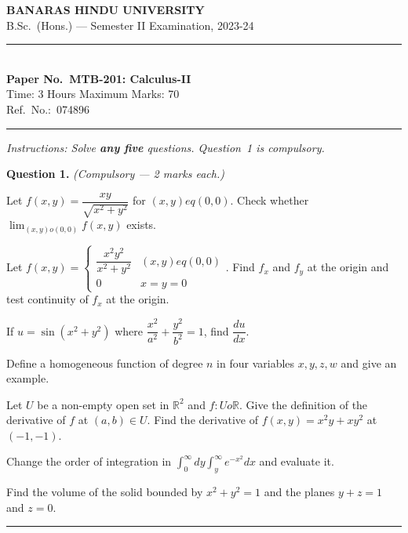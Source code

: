 \documentclass[11pt,a4paper]{article}
\begin{document}
\begin{center}
  {\large\bfseries BANARAS HINDU UNIVERSITY}\\[2pt]
  {\normalsize B.Sc.\ (Hons.) --- Semester II Examination, 2023-24}\\[6pt]
  \rule{0.8\linewidth}{0.5pt}\\[6pt]
  {\large\bfseries Paper No.\ MTB-201: Calculus-II}\\[4pt]
  {\normalsize Time: 3 Hours \hfill Maximum Marks: 70}\\[2pt]
  {\small Ref.\ No.:\ 074896}
\end{center}
\rule{\linewidth}{0.4pt}
\smallskip



\noindent   \textit{Instructions: Solve   \textbf{any five} questions. Question~1 is compulsory.}
\bigskip




\noindent   \textbf{Question 1.}   \textit{(Compulsory --- 2 marks each.)}

\begin{parts}
  \item Let $f(x,y)=\dfrac{xy}{\sqrt{x^2+y^2}}$ for $(x,y)
eq(0,0)$. Check whether $\displaystyle\lim_{(x,y) o(0,0)}f(x,y)$ exists.
  \item Let $f(x,y)=
\begin{cases}\dfrac{x^2y^2}{x^2+y^2} & (x,y)
eq(0,0) \\ 0 & x=y=0\end{cases}$. Find $f_x$ and $f_y$ at the origin and test continuity of $f_x$ at the origin.
  \item If $u=\sin(x^2+y^2)$ where $\dfrac{x^2}{a^2}+\dfrac{y^2}{b^2}=1$, find $\dfrac{du}{dx}$.
  \item Define a homogeneous function of degree $n$ in four variables $x,y,z,w$ and give an example.
  \item Let $U$ be a non-empty open set in $\mathbb{R}^2$ and $f:U o\mathbb{R}$. Give the definition of the derivative of $f$ at $(a,b)\in U$. Find the derivative of $f(x,y)=x^2y+xy^2$ at $(-1,-1)$.
  \item Change the order of integration in $\displaystyle\int_0^{\infty}dy\int_y^{\infty}e^{-x^2}dx$ and evaluate it.
  \item Find the volume of the solid bounded by $x^2+y^2=1$ and the planes $y+z=1$ and $z=0$.
\end{parts}
\medskip\rule{\linewidth}{0.2pt}

\medskip
\end{document}
